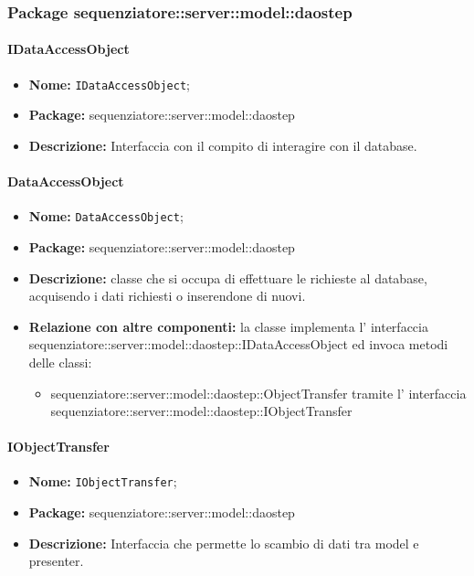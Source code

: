 \subsubsection{Package sequenziatore::server::model::daostep}
\paragraph{IDataAccessObject}
	\begin{itemize}
		\item \textbf{Nome:} \texttt{IDataAccessObject};
		\item \textbf{Package:} sequenziatore::server::model::daostep
		\item \textbf{Descrizione:} Interfaccia con il compito di interagire con il database.
	\end{itemize}
\paragraph{DataAccessObject}
	\begin{itemize}
		\item \textbf{Nome:} \texttt{DataAccessObject};
		\item \textbf{Package:} sequenziatore::server::model::daostep
		\item \textbf{Descrizione:} classe che si occupa di effettuare le richieste al database, acquisendo i dati richiesti o inserendone di nuovi.
		\item \textbf{Relazione con altre componenti:} la classe implementa l' interfaccia sequenziatore::server::model::daostep::IDataAccessObject ed invoca metodi delle classi:
		\begin{itemize}
			\item sequenziatore::server::model::daostep::ObjectTransfer tramite l' interfaccia sequenziatore::server::model::daostep::IObjectTransfer
	\end{itemize}
	\end{itemize}
\paragraph{IObjectTransfer}
	\begin{itemize}
		\item \textbf{Nome:} \texttt{IObjectTransfer};
		\item \textbf{Package:} sequenziatore::server::model::daostep
		\item \textbf{Descrizione:} Interfaccia che permette lo scambio di dati tra model e presenter.
	\end{itemize}
